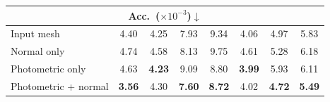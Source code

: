 \begin{table}[t]
\begin{tabular}{@{}lccccccc@{}}
\midrule
\multicolumn{8}{c}{Acc.\ ($\times10^{-3}$)$\downarrow$} \\
\midrule
Input mesh & 4.40 & 4.25 & 7.93 & 9.34 & 4.06 & 4.97 & 5.83 \\
\midrule
Normal only & \cellcolor{yellow!25} 4.74 & \cellcolor{yellow!25} 4.58 & \cellcolor{orange!25} 8.13 & \cellcolor{yellow!25} 9.75 & \cellcolor{yellow!25} 4.61 & \cellcolor{orange!25} 5.28 & \cellcolor{yellow!25} 6.18 \\
Photometric only & \cellcolor{orange!25} 4.63 & \cellcolor{green!25} \textbf{4.23} & \cellcolor{yellow!25} 9.09 & \cellcolor{orange!25} 8.80 & \cellcolor{green!25} \textbf{3.99} & \cellcolor{yellow!25} 5.93 & \cellcolor{orange!25} 6.11 \\
Photometric + normal & \cellcolor{green!25} \textbf{3.56} & \cellcolor{orange!25} 4.30 & \cellcolor{green!25} \textbf{7.60} & \cellcolor{green!25} \textbf{8.72} & \cellcolor{orange!25} 4.02 & \cellcolor{green!25} \textbf{4.72} & \cellcolor{green!25} \textbf{5.49} \\
\bottomrule
\end{tabular}
\end{table}

